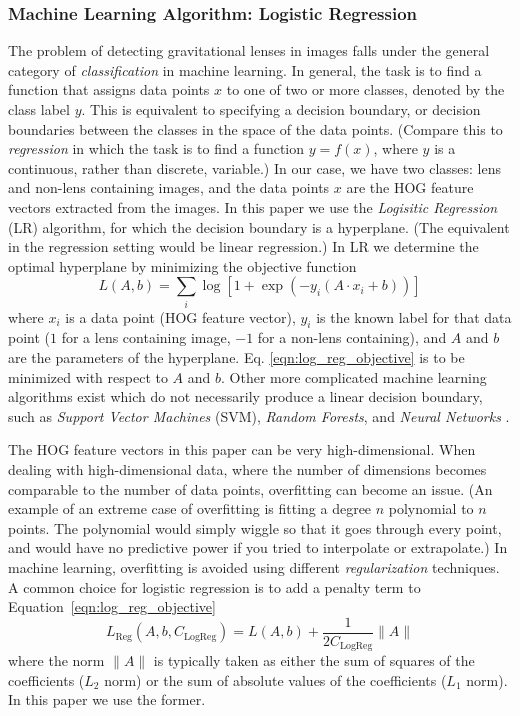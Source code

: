 \documentclass{emulateapj}
\begin{document}
\subsubsection{Machine Learning Algorithm: Logistic Regression}\label{sec:LR}
The problem of detecting gravitational lenses in images falls under
the general category of {\em{classification}} in machine learning. In
general, the task is to find a function that assigns data points $x$ to
one of two or more classes, denoted by the class label $y$.  This is
equivalent to specifying a decision boundary, or decision boundaries
between the classes in the space of the data points.  (Compare this to
{\em{regression}} in which the task is to find a function $y=f(x)$,
where $y$ is a continuous, rather than discrete, variable.) In our
case, we have two classes: lens and non-lens containing images, and
the data points $x$ are the HOG feature vectors extracted from the
images.  In this paper we use the {\em Logisitic Regression}
(LR) algorithm, for which the decision boundary is a hyperplane.  (The
equivalent in the regression setting would be linear regression.) In
LR we determine the optimal hyperplane by minimizing the objective
function
\begin{equation}
\label{eqn:log_reg_objective}
L(A,b) = \sum_i \log \left[1 + \exp \left(-y_i (A \cdot x_i + b) \right) \right]
\end{equation}
where $x_i$ is a data point (HOG feature vector), $y_i$ is the
known label for that data point ($1$ for a lens containing
image, $-1$ for a non-lens containing), and $A$ and $b$ are
the parameters of the hyperplane. Eq. \ref{eqn:log_reg_objective}
is to be minimized with respect to $A$ and $b$.
Other more complicated machine learning algorithms exist which
do not necessarily produce a linear decision boundary, such as
{\em Support Vector Machines} (SVM), {\em Random Forests}, and
{\em Neural Networks} \citep{hastie_09}.

The HOG feature vectors in this paper can be very high-dimensional.
When dealing with high-dimensional data, where the number of
dimensions becomes comparable to the number of data points,
overfitting can become an issue. (An example of an extreme case
of overfitting is fitting a degree $n$ polynomial to $n$
points.  The polynomial would simply wiggle so that it goes
through every point, and would have no predictive power if you
tried to interpolate or extrapolate.) In machine learning,
overfitting is avoided using different {\em{regularization}}
techniques. A common choice for logistic regression is to
add a penalty term to Equation~\ref{eqn:log_reg_objective}
\begin{equation}\label{eqn:log_reg_regularized}
L_\text{Reg}(A,b,C_\text{LogReg}) = L(A,b) + \frac{1}{2C_\text{LogReg}} \|A\|
\end{equation}
where the norm $\|A\|$ is typically taken as either the
sum of squares of the coefficients ($L_2$ norm) or the sum
of absolute values of the coefficients ($L_1$ norm).  In this
paper we use the former.
\end{document}
